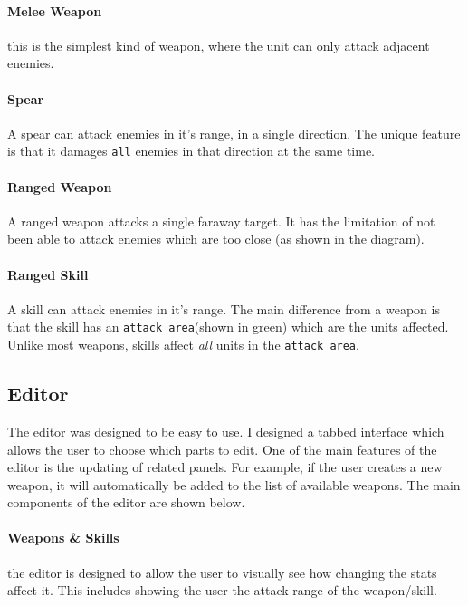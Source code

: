 \paragraph{Melee Weapon} this is the simplest kind of weapon, where the unit can only attack adjacent enemies.

\paragraph{Spear} A spear can attack  enemies in it's range, in a single direction. The unique feature is that it damages \texttt{all} enemies in that direction at the same time.

\paragraph{Ranged Weapon} A ranged weapon attacks a single faraway target. It has the limitation of not been able to attack enemies which are too close (as shown in the diagram). 

\paragraph{Ranged Skill} A skill can attack  enemies in it's range. The main difference from a weapon is that the skill has an \texttt{attack area}(shown in green) which are the units affected. Unlike most weapons, skills affect \emph{all} units in the \texttt{attack area}.

\clearpage
\subsection{Editor}
The editor was designed to be easy to use. I designed a tabbed interface which allows the user to choose which parts to edit.  One of the main features of the editor is the updating of related panels. For example, if the user creates a new weapon, it will automatically be added to the list of available weapons. 
The main components of the editor are shown below.

\paragraph{Weapons \& Skills} the editor is designed to allow the user to visually see how changing the stats affect it. This includes showing the user the attack range of the weapon/skill.

